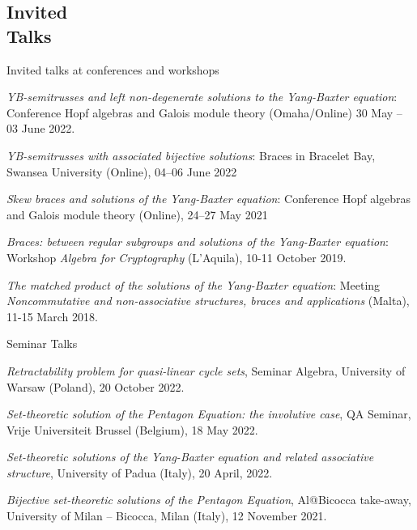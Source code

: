 \documentclass[margin,line]{res}
\begin{document}
\begin{resume}
{\vspace{-0.1in}
\section{\sc  Invited\\ Talks}

{\sc Invited talks at conferences and workshops}

\vspace{-0.1in}
\emph{YB-semitrusses and left non-degenerate solutions to the Yang-Baxter equation}:
Conference Hopf algebras and Galois module theory (Omaha/Online) 30 May -- 03 June 2022.

\vspace{-0.1in}
\emph{YB-semitrusses with associated bijective solutions}:
Braces in Bracelet Bay, Swansea University (Online), 04--06 June 2022

\vspace{-0.1in}
\emph{Skew braces and solutions of the Yang-Baxter equation}:
Conference  Hopf algebras and Galois module theory (Online), 24--27 May 2021

\vspace{-0.1in}
\emph{Braces: between regular subgroups and solutions of the Yang-Baxter equation}: Workshop \emph{Algebra for Cryptography} (L'Aquila), 10-11 October 2019.


\vspace{-0.1in}
\emph{The matched product of the solutions of the Yang-Baxter equation}: Meeting \emph{Noncommutative and non-associative structures, braces and applications} (Malta), 11-15 March 2018.


\vspace{-0.1in}
{\sc Seminar Talks}

\vspace{-0.1in}
\emph{Retractability problem for quasi-linear cycle sets}, Seminar Algebra, University of Warsaw (Poland), 20 October 2022.

\vspace{-0.1in}
\emph{Set-theoretic solution of the Pentagon Equation: the involutive case}, QA Seminar, Vrije Universiteit Brussel (Belgium), 18 May 2022.

\vspace{-0.1in}
\emph{Set-theoretic solutions of the Yang-Baxter equation and related associative structure}, University of Padua (Italy), 20 April, 2022.

\vspace{-0.1in}
\emph{Bijective set-theoretic solutions of the Pentagon Equation},  Al@Bicocca take-away, University of Milan – Bicocca, Milan (Italy), 12 November 2021.

}
\end{resume}
\end{document}
